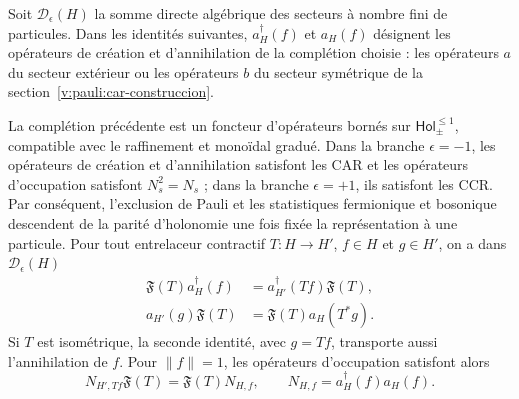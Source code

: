 Soit \(\mathcal D_\epsilon(H)\) la somme directe algébrique des secteurs
à nombre fini de particules. Dans les identités suivantes, \(a_H^\dagger(f)\)
et \(a_H(f)\) désignent les opérateurs de création et d’annihilation de la
complétion choisie : les opérateurs \(a\) du secteur extérieur ou les
opérateurs \(b\) du secteur symétrique de la
section~\ref{v:pauli:car-construccion}.

\begin{theorem}
\label{v:rec:fock_gibbs:statement:01}
La complétion précédente est un foncteur d’opérateurs bornés sur
\(\mathsf{Hol}_{\pm}^{\leq1}\), compatible avec le raffinement et
monoïdal gradué. Dans la branche \(\epsilon=-1\), les opérateurs de création et
d’annihilation satisfont les CAR et les opérateurs d’occupation satisfont
\(N_s^2=N_s\) ; dans la branche \(\epsilon=+1\), ils satisfont les CCR. Par conséquent,
l’exclusion de Pauli et les statistiques fermionique et bosonique descendent de la
parité d’holonomie une fois fixée la représentation à une particule.
Pour tout entrelaceur contractif \(T:H\to H'\), \(f\in H\) et
\(g\in H'\), on a dans \(\mathcal D_\epsilon(H)\)
\begin{align}
 \mathfrak F(T)a_H^\dagger(f)
 &=a_{H'}^\dagger(Tf)\mathfrak F(T),
 \label{v:fock:eq:transporte-creacion}\\
 a_{H'}(g)\mathfrak F(T)
 &=\mathfrak F(T)a_H(T^*g).
 \label{v:fock:eq:transporte-aniquilacion}
\end{align}
Si \(T\) est isométrique, la seconde identité, avec \(g=Tf\), transporte
aussi l’annihilation de \(f\). Pour \(\|f\|=1\), les opérateurs
d’occupation satisfont alors
\begin{equation}
 N_{H',Tf}\mathfrak F(T)=\mathfrak F(T)N_{H,f},
 \qquad N_{H,f}=a_H^\dagger(f)a_H(f).
 \label{v:fock:eq:transporte-ocupacion}
\end{equation}
\end{theorem}

